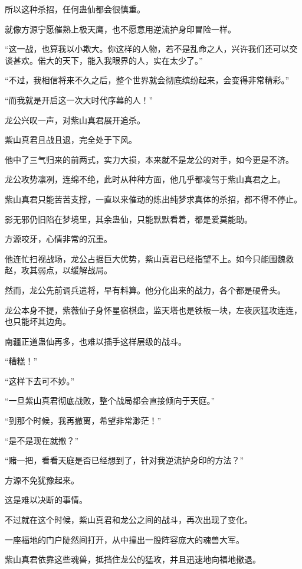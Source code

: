\begin{this_body}
所以这种杀招，任何蛊仙都会很慎重。

就像方源宁愿催熟上极天鹰，也不愿意用逆流护身印冒险一样。

“这一战，也算我以小欺大。你这样的人物，若不是乱命之人，兴许我们还可以交谈甚欢。偌大的天下，能入我眼界的人，实在太少了。”

“不过，我相信将来不久之后，整个世界就会彻底缤纷起来，会变得非常精彩。”

“而我就是开启这一次大时代序幕的人！”

龙公兴叹一声，对紫山真君展开追杀。

紫山真君且战且退，完全处于下风。

他中了三气归来的前两式，实力大损，本来就不是龙公的对手，如今更是不济。

龙公攻势凛冽，连绵不绝，此时从种种方面，他几乎都凌驾于紫山真君之上。

紫山真君只能苦苦支撑，一直以来催动的炼出纯梦求真体的杀招，都不得不停止。

影无邪仍旧陷在梦境里，其余蛊仙，只能默默看着，都是爱莫能助。

方源咬牙，心情非常的沉重。

他连忙扫视战场，龙公占据巨大优势，紫山真君已经指望不上。如今只能围魏救赵，攻其弱点，以缓解战局。

然而，龙公先前调兵遣将，早有料算。他分化出来的战力，各个都是硬骨头。

龙公本身不提，紫薇仙子身怀星宿棋盘，监天塔也是铁板一块，左夜灰猛攻连连，也只能坏其边角。

南疆正道蛊仙再多，也难以插手这样层级的战斗。

“糟糕！”

“这样下去可不妙。”

“一旦紫山真君彻底战败，整个战局都会直接倾向于天庭。”

“到那个时候，我再撤离，希望非常渺茫！”

“是不是现在就撤？”

“赌一把，看看天庭是否已经想到了，针对我逆流护身印的方法？”

方源不免犹豫起来。

这是难以决断的事情。

不过就在这个时候，紫山真君和龙公之间的战斗，再次出现了变化。

一座福地的门户陡然间打开，从中撞出一股阵容庞大的魂兽大军。

紫山真君依靠这些魂兽，抵挡住龙公的猛攻，并且迅速地向福地撤退。


\end{this_body}
